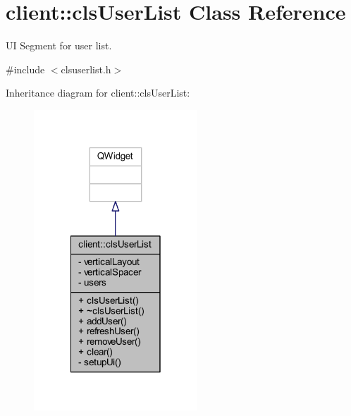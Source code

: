 \hypertarget{classclient_1_1cls_user_list}{\section{client\-:\-:cls\-User\-List Class Reference}
\label{de/dda/classclient_1_1cls_user_list}
}


U\-I Segment for user list.  




{\ttfamily \#include $<$clsuserlist.\-h$>$}



Inheritance diagram for client\-:\-:cls\-User\-List\-:\nopagebreak
\begin{figure}[H]
\begin{center}
\leavevmode
\includegraphics[width=174pt]{da/d4f/classclient_1_1cls_user_list__inherit__graph}
\end{center}
\end{figure}



